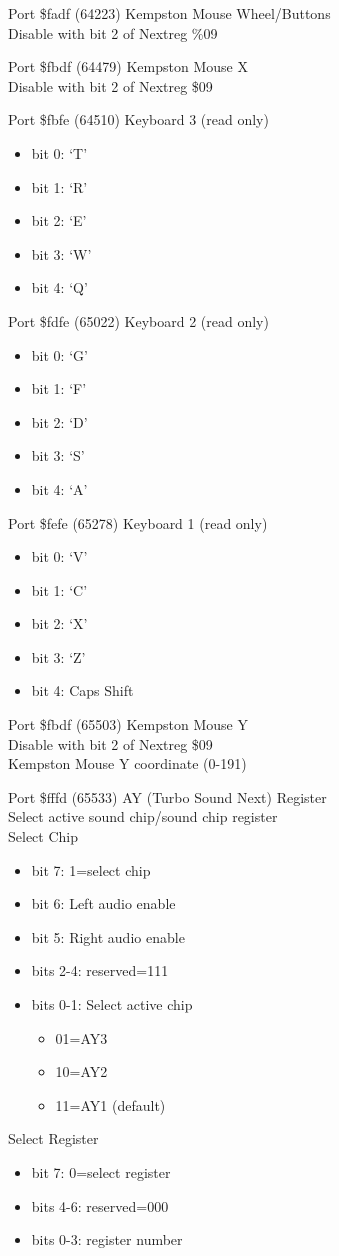 Port \$fadf (64223) Kempston Mouse Wheel/Buttons\\
Disable with bit 2 of Nextreg \%09

Port \$fbdf (64479) Kempston Mouse X\\
Disable with bit 2 of Nextreg \$09

Port \$fbfe (64510) Keyboard 3 (read only)
\begin{itemize}
\item[] bit 0: ‘T’
\item[] bit 1: ‘R’
\item[] bit 2: ‘E’
\item[] bit 3: ‘W’
\item[] bit 4: ‘Q’
\end{itemize}

Port \$fdfe (65022) Keyboard 2 (read only)
\begin{itemize}
\item[] bit 0: ‘G’
\item[] bit 1: ‘F’
\item[] bit 2: ‘D’
\item[] bit 3: ‘S’
\item[] bit 4: ‘A’
\end{itemize}

Port \$fefe (65278) Keyboard 1 (read only)
\begin{itemize}
\item[] bit 0: ‘V’
\item[] bit 1: ‘C’
\item[] bit 2: ‘X’
\item[] bit 3: ‘Z’
\item[] bit 4: Caps Shift
\end{itemize}

Port \$fbdf (65503) Kempston Mouse Y\\
Disable with bit 2 of Nextreg \$09\\
Kempston Mouse Y coordinate (0-191)

Port \$fffd (65533) AY (Turbo Sound Next) Register\\
Select active sound chip/sound chip register\\
Select Chip
\begin{itemize}
\item[] bit 7: 1=select chip
\item[] bit 6: Left audio enable
\item[] bit 5: Right audio enable
\item[] bits 2-4: reserved=111
\item[] bits 0-1: Select active chip
  \begin{itemize}
  \item[] 01=AY3
  \item[] 10=AY2
  \item[] 11=AY1 (default)
  \end{itemize}
\end{itemize}
 Select Register
\begin{itemize}
\item[] bit 7: 0=select register
\item[] bits 4-6: reserved=000
\item[] bits 0-3: register number
\end{itemize}
